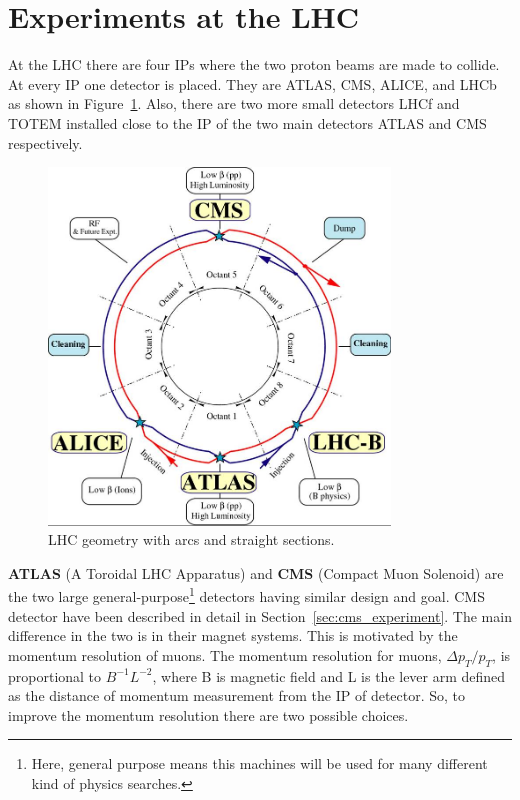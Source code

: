\section{Experiments at the LHC} %
\label{sec:experiments_at_the_lhc}

At the LHC there are four IPs where the two proton beams are made to collide. At every IP one detector is placed. They are ATLAS, CMS, ALICE, and LHCb as shown in Figure~\ref{fig:LHCgeometry}. Also, there are two more small detectors LHCf and TOTEM installed close to the IP of the two main detectors ATLAS and CMS respectively.
\begin{figure}[!htbp]
	\centering
	\includegraphics[width=0.81\textwidth]{figures/LHC/lhc-schematic.jpg}
	\caption{LHC geometry with arcs and straight sections.}
	\label{fig:LHCgeometry}
\end{figure}
\newline
{\bf ATLAS} (A Toroidal LHC Apparatus) and {\bf CMS} (Compact Muon Solenoid) are the two large general-purpose\footnote{Here, general purpose means this machines will be used for many different kind of physics searches.} detectors having similar design and goal. CMS detector have been described in detail in Section~\ref{sec:cms_experiment}. The main difference in the two is in their magnet systems. This is motivated by the momentum resolution of muons. The momentum resolution for muons, $\Delta p_T/p_T$, is proportional to  $B^{-1}L^{-2}$, where B is magnetic field and L is the lever arm defined as the distance of momentum measurement from the IP of detector. So, to improve the momentum resolution there are two possible choices.


